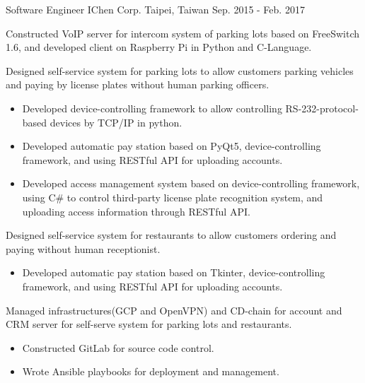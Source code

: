 \begin{cventries}
    \cventry
        {Software Engineer}
        {IChen Corp.}
        {Taipei, Taiwan}
        {Sep. 2015 - Feb. 2017}
        {
            \begin{cvitems}
                \item
                    {
                        Constructed VoIP server for intercom system of parking lots based on FreeSwitch 1.6, and developed client on Raspberry Pi in Python and C-Language.
                    }
                \item
                    {
                        Designed self-service system for parking lots to allow customers parking vehicles and paying by license plates without human parking officers.
                        \begin{itemize}
                            \item Developed device-controlling framework to allow controlling RS-232-protocol-based devices by TCP/IP in python.
                            \item Developed automatic pay station based on PyQt5, device-controlling framework, and using RESTful API for uploading accounts.
                            \item Developed access management system based on device-controlling framework, using C\# to control third-party license plate recognition system, and uploading access information through RESTful API.
                        \end{itemize}
                    }
                \item 
                    {  
                        Designed self-service system for restaurants to allow customers ordering and paying without human receptionist.
                        \begin{itemize}
                            \item Developed automatic pay station based on Tkinter, device-controlling framework, and using RESTful API for uploading accounts. 
                        \end{itemize}
                    }
                \item
                    {
                        Managed infrastructures(GCP and OpenVPN) and CD-chain for account and CRM server for self-serve system for parking lots and restaurants.
                        \begin{itemize}
                            \item Constructed GitLab for source code control.
                            \item Wrote Ansible playbooks for deployment and management.
                        \end{itemize}
                    }
            \end{cvitems}
        }


\end{cventries}
